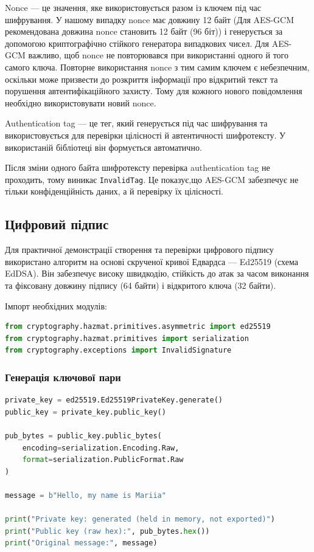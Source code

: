 Nonce --- це значення, яке використовується разом із ключем під час шифрування. 
У нашому випадку nonce має довжину 12 байт (Для AES-GCM рекомендована довжина nonce становить 12 байт (96 біт))
і генерується за допомогою криптографічно стійкого генератора випадкових чисел.
Для AES-GCM важливо, щоб nonce не повторювався при використанні одного й того самого ключа. 
Повторне використання nonce з тим самим ключем є небезпечним, оскільки може призвести до розкриття інформації про відкритий текст та порушення автентифікаційного захисту. 
Тому для кожного нового повідомлення необхідно використовувати новий nonce.

Authentication tag --- це тег, який генерується під час шифрування та використовується для 
перевірки цілісності й автентичності шифротексту. У використаній бібліотеці він формується автоматично.

Після зміни одного байта шифротексту перевірка authentication tag не проходить, тому виникає  \texttt{InvalidTag}. 
Це показує,що AES-GCM забезпечує не тільки конфіденційність даних, а й перевірку їх цілісності.

\subsection{Цифровий підпис}

Для практичної демонстрації створення та перевірки цифрового підпису використано алгоритм на основі скрученої кривої Едвардса --- Ed25519 (схема EdDSA). Він забезпечує високу швидкодію, стійкість до атак за часом виконання та фіксовану довжину підпису (64 байти) і відкритого ключа (32 байти).

Імпорт необхідних модулів:
\begin{lstlisting}[language=Python]
from cryptography.hazmat.primitives.asymmetric import ed25519
from cryptography.hazmat.primitives import serialization
from cryptography.exceptions import InvalidSignature
\end{lstlisting}

\subsubsection{Генерація ключової пари}

\begin{lstlisting}[language=Python]
private_key = ed25519.Ed25519PrivateKey.generate()
public_key = private_key.public_key()

pub_bytes = public_key.public_bytes(
    encoding=serialization.Encoding.Raw,
    format=serialization.PublicFormat.Raw
)

message = b"Hello, my name is Mariia"

print("Private key: generated (held in memory, not exported)")
print("Public key (raw hex):", pub_bytes.hex())
print("Original message:", message)
\end{lstlisting}

